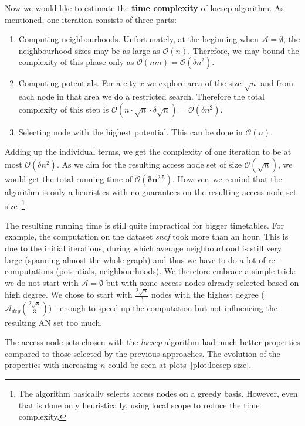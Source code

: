 		\noindent Now we would like to estimate the \textbf{time complexity} of locsep algorithm. As mentioned, one iteration consists of three parts:
		\begin{enumerate}
			\item Computing neighbourhoods. Unfortunately, at the beginning when $\mathcal{A} = \emptyset$, the neighbourhood sizes may be as large as $\mathcal{O}(n)$. Therefore, we may bound the complexity of this phase only as $\mathcal{O}(nm) = \mathcal{O}(\delta n^{2})$.
			\item Computing potentials. For a city $x$ we explore area of the size $\sqrt{n}$ and from each node in that area we do a restricted search. Therefore the total complexity of this step is $\mathcal{O}(n \cdot \sqrt{n} \cdot \delta \sqrt{n}) = \mathcal{O}(\delta n^{2})$.
			\item Selecting node with the highest potential. This can be done in $\mathcal{O}(n)$.
		\end{enumerate}
		\hspace*{\fill}
		
		\noindent Adding up the individual terms, we get the complexity of one iteration to be at most $\mathcal{O}(\delta n^{2})$. As we aim for the resulting access node set of size $\mathcal{O}(\sqrt{n})$, we would get the total running time of $\bm{\mathcal{O}(\delta n^{2.5})}$. However, we remind that the algorithm is only a heuristics with no guarantees on the resulting access node set size~\footnote{The algorithm basically selects access nodes on a greedy basis. However, even that is done only heuristically, using local scope to reduce the time complexity.}.
		
		The resulting running time is still quite impractical for bigger timetables. For example, the computation on the dataset \textit{sncf} took more than an hour. This is due to the initial iterations, during which average neighbourhood is still very large (spanning almost the whole graph) and thus we have to do a lot of re-computations (potentials, neighbourhoods). We therefore embrace a simple trick: we do not start with $\mathcal{A} = \emptyset$ but with some access nodes already selected based on high degree. We chose to start with $\frac{2 \sqrt{n}}{3}$ nodes with the highest degree ($\mathcal{A}_{deg}(\frac{2 \sqrt{n}}{3})$) - enough to speed-up the computation but not influencing the resulting AN set too much. 
		
		The access node sets chosen with the \textit{locsep} algorithm had much better properties compared to those selected by the previous approaches. The evolution of the properties with increasing $n$ could be seen at plots~\ref{plot:locsep-size}. \\
		
